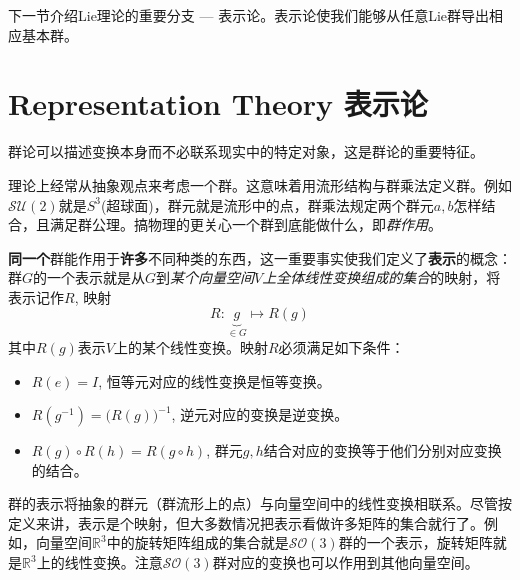 下一节介绍Lie理论的重要分支 --- 表示论。表示论使我们能够从任意Lie群导出相应基本群。



\section[表示论]{Representation Theory 表示论}
\label{sec3.5}
群论可以描述变换本身而不必联系现实中的特定对象，这是群论的重要特征。

理论上经常从抽象观点来考虑一个群。这意味着用流形结构与群乘法定义群。例如$\mathcal{SU}(2)$就是$S^3$(超球面)，群元就是流形中的点，群乘法规定两个群元$a,b$怎样结合，且满足群公理。搞物理的更关心一个群到底能做什么，即{\it 群作用}。

{\bf 同一个}群能作用于{\bf 许多}不同种类的东西，这一重要事实使我们定义了{\bf 表示}的概念：群$G$的一个表示就是从$G$到{\it 某个向量空间$V$上全体线性变换组成的集合}的映射，将表示记作$R$, 映射
\begin{equation}
\label{equ3.86}
R: \underbrace{g}_{\in G} \mapsto R(g)
\end{equation}
其中$R(g)$表示$V$上的某个线性变换。映射$R$必须满足如下条件：
\begin{itemize}
	\item $R(e) = I$, 恒等元对应的线性变换是恒等变换。
	\item $R(g^{-1}) = \big( R(g) \big)^{-1}$, 逆元对应的变换是逆变换。
	\item $R(g) \circ R(h) = R(g \circ h)$, 群元$g,h$结合对应的变换等于他们分别对应变换的结合。
\end{itemize}

群的表示将抽象的群元（群流形上的点）与向量空间中的线性变换相联系。尽管按定义来讲，表示是个映射，但大多数情况把表示看做许多矩阵的集合就行了。例如，向量空间$\mathbb{R}^3$中的旋转矩阵组成的集合就是$\mathcal{SO}(3)$群的一个表示，旋转矩阵就是$\mathbb{R}^3$上的线性变换。注意$\mathcal{SO}(3)$群对应的变换也可以作用到其他向量空间。

